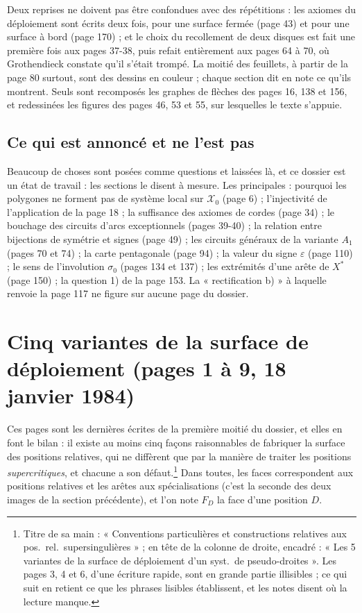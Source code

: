 \documentclass[11pt,a4paper]{article}
\begin{document}
Deux reprises ne doivent pas être confondues avec des répétitions : les axiomes
du déploiement sont écrits deux fois, pour une surface fermée (page 43) et pour
une surface à bord (page 170) ; et le choix du recollement de deux disques est
fait une première fois aux pages 37-38, puis refait entièrement aux pages 64 à
70, où Grothendieck constate qu'il s'était trompé. La moitié des feuillets, à
partir de la page 80 surtout, sont des dessins en couleur ; chaque section dit
en note ce qu'ils montrent. Seuls sont recomposés les graphes de flèches des
pages 16, 138 et 156, et redessinées les figures des pages 46, 53 et 55, sur
lesquelles le texte s'appuie.

\subsection*{Ce qui est annoncé et ne l'est pas}

Beaucoup de choses sont posées comme questions et laissées là, et ce dossier est
un état de travail : les sections le disent à mesure. Les principales :
pourquoi les polygones ne forment pas de système local sur $\mathcal{X}_0$
(page 6) ; l'injectivité de l'application de la page 18 ; la suffisance des
axiomes de cordes (page 34) ; le bouchage des circuits d'arcs exceptionnels
(pages 39-40) ; la relation entre bijections de symétrie et signes (page 49) ;
les circuits généraux de la variante $A_1$ (pages 70 et 74) ; la carte
pentagonale (page 94) ; la valeur du signe $\varepsilon$ (page 110) ; le sens
de l'involution $\sigma_0$ (pages 134 et 137) ; les extrémités d'une arête de
$X^{*}$ (page 150) ; la question 1) de la page 153. La « rectification b) » à
laquelle renvoie la page 117 ne figure sur aucune page du dossier.

\section*{Cinq variantes de la surface de déploiement (pages 1 à 9, 18 janvier 1984)}

Ces pages sont les dernières écrites de la première moitié du dossier, et elles
en font le bilan : il existe au moins cinq façons raisonnables de fabriquer la
surface des positions relatives, qui ne diffèrent que par la manière de traiter
les positions \emph{supercritiques}, et chacune a son défaut.\footnote{Titre de
sa main : « Conventions particulières et constructions relatives aux pos.\ rel.\
supersingulières » ; en tête de la colonne de droite, encadré : « Les 5
variantes de la surface de déploiement d'un syst.\ de pseudo-droites ». Les
pages 3, 4 et 6, d'une écriture rapide, sont en grande partie illisibles ; ce
qui suit en retient ce que les phrases lisibles établissent, et les notes disent
où la lecture manque.} Dans toutes, les faces correspondent aux positions
relatives et les arêtes aux spécialisations (c'est la seconde des deux images
de la section précédente), et l'on note $F_D$ la face d'une position $D$.
\end{document}
